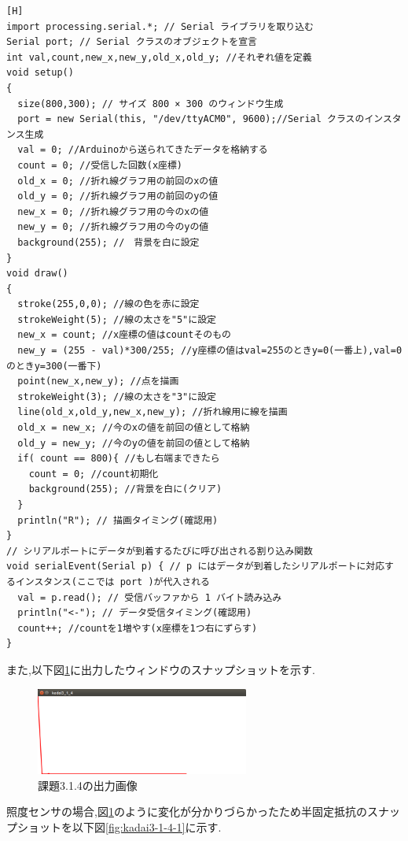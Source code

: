 \documentclass{jarticle}
\begin{document}
\begin{lstlisting}[caption = 課題3.1.4,label=code:kadai3-1-4][H]
import processing.serial.*; // Serial ライブラリを取り込む
Serial port; // Serial クラスのオブジェクトを宣言
int val,count,new_x,new_y,old_x,old_y; //それぞれ値を定義
void setup()
{
  size(800,300); // サイズ 800 × 300 のウィンドウ生成
  port = new Serial(this, "/dev/ttyACM0", 9600);//Serial クラスのインスタンス生成
  val = 0; //Arduinoから送られてきたデータを格納する
  count = 0; //受信した回数(x座標)
  old_x = 0; //折れ線グラフ用の前回のxの値
  old_y = 0; //折れ線グラフ用の前回のyの値
  new_x = 0; //折れ線グラフ用の今のxの値
  new_y = 0; //折れ線グラフ用の今のyの値
  background(255); //　背景を白に設定
}
void draw()
{
  stroke(255,0,0); //線の色を赤に設定
  strokeWeight(5); //線の太さを"5"に設定
  new_x = count; //x座標の値はcountそのもの
  new_y = (255 - val)*300/255; //y座標の値はval=255のときy=0(一番上),val=0のときy=300(一番下)
  point(new_x,new_y); //点を描画
  strokeWeight(3); //線の太さを"3"に設定
  line(old_x,old_y,new_x,new_y); //折れ線用に線を描画
  old_x = new_x; //今のxの値を前回の値として格納
  old_y = new_y; //今のyの値を前回の値として格納
  if( count == 800){ //もし右端まできたら
    count = 0; //count初期化
    background(255); //背景を白に(クリア)
  }
  println("R"); // 描画タイミング(確認用)
}
// シリアルポートにデータが到着するたびに呼び出される割り込み関数
void serialEvent(Serial p) { // p にはデータが到着したシリアルポートに対応するインスタンス(ここでは port )が代入される
  val = p.read(); // 受信バッファから 1 バイト読み込み
  println("<-"); // データ受信タイミング(確認用)
  count++; //countを1増やす(x座標を1つ右にずらす)
}
\end{lstlisting}
また,以下図\ref{fig:kadai3-1-4}に出力したウィンドウのスナップショットを示す.

\begin{figure}[H]
\begin{center}
\includegraphics[width=7.0cm]{images/kadai3-1-4-2.png}
\caption{課題3.1.4の出力画像}
\label{fig:kadai3-1-4}
\end{center}
\end{figure}

照度センサの場合,図\ref{fig:kadai3-1-4}のように変化が分かりづらかったため半固定抵抗のスナップショットを以下図\ref{fig:kadai3-1-4-1}に示す.
\end{document}

